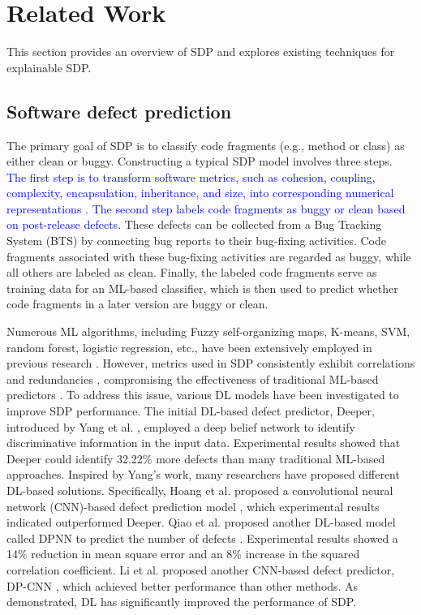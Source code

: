 \section{Related Work}
This section provides an overview of SDP and explores existing techniques for explainable SDP.
\subsection{Software defect prediction}\label{subsec_2}
The primary goal of SDP is to classify code fragments (e.g., method or class) as either clean or buggy. Constructing a typical SDP model involves three steps. \textcolor{blue}{The first step is to transform software metrics, such as cohesion, coupling, complexity, encapsulation, inheritance, and size, into corresponding numerical representations \cite{12}.} \textcolor{blue}{The second step labels code fragments as buggy or clean based on post-release defects.} These defects can be collected from a Bug Tracking System (BTS) by connecting bug reports to their bug-fixing activities. Code fragments associated with these bug-fixing activities are regarded as buggy, while all others are labeled as clean. Finally, the labeled code fragments serve as training data for an ML-based classifier, which is then used to predict whether code fragments in a later version are buggy or clean.

Numerous ML algorithms, including Fuzzy self-organizing maps, K-means, SVM, random forest, logistic regression, etc., have been extensively employed in previous research \cite{20, 21, 22, 23, 24, 25, 26}. However, metrics used in SDP consistently exhibit correlations and redundancies \cite{13}, compromising the effectiveness of traditional ML-based predictors \cite{14}. To address this issue, various DL models have been investigated to improve SDP performance. The initial DL-based defect predictor, Deeper, introduced by Yang et al. \cite{27}, employed a deep belief network to identify discriminative information in the input data. Experimental results showed that Deeper could identify 32.22\% more defects than many traditional ML-based approaches.
Inspired by Yang’s work, many researchers have proposed different DL-based solutions. Specifically, Hoang et al. proposed a convolutional neural network (CNN)-based defect prediction model \cite{28}, which experimental results indicated outperformed Deeper. Qiao et al. proposed another DL-based model called DPNN to predict the number of defects \cite{29}. Experimental results showed a 14\% reduction in mean square error and an 8\% increase in the squared correlation coefficient. Li et al. proposed another CNN-based defect predictor, DP-CNN \cite{30}, which achieved better performance than other methods. As demonstrated, DL has significantly improved the performance of SDP.

